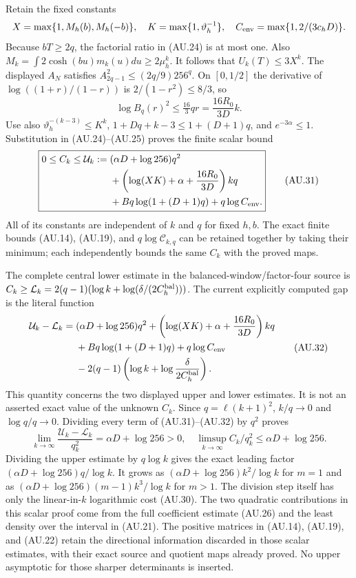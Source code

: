Retain the fixed constants
\[
 X=\max\{1,M_h(b),M_h(-b)\},\quad
 K=\max\{1,\vartheta_h^{-1}\},\quad
 C_{\rm env}=\max\{1,2/(3c_hD)\}.
\]
Because $bT\ge2q$, the factorial ratio in (AU.24) is at most one.
Also $M_k=\int2\cosh(bu)m_k(u)du\ge2\mu_h^k$.
It follows that $U_k(T)\le3X^k$.
The displayed $A_N$ satisfies
$A_{2q-1}^2\le(2q/9)256^q$.
On $[0,1/2]$ the derivative of $\log((1+r)/(1-r))$ is
$2/(1-r^2)\le8/3$, so
\[
 \log B_q(r)^2\le\tfrac{16}{3}qr
                         =\frac{16R_0}{3D}k.             \tag{AU.30}
\]
Use also $\vartheta_h^{-(k-3)}\le K^k$,
$1+Dq+k-3\le1+(D+1)q$, and $e^{-3\alpha}\le1$.
Substitution in (AU.24)--(AU.25) proves the finite scalar bound
\[
 \boxed{\begin{aligned}
 0\le C_k\le\mathcal U_k:={}&(\alpha D+\log256)q^2\\
 &+\left(\log(XK)+\alpha+\frac{16R_0}{3D}\right)kq\\
 &+Bq\log(1+(D+1)q)+q\log C_{\rm env}.
 \end{aligned}}                                             \tag{AU.31}
\]
All of its constants are independent of $k$ and $q$ for fixed $h,b$.
The exact finite bounds (AU.14), (AU.19), and $q\log\mathcal C_{k,q}$
can be retained together by taking their minimum; each independently
bounds the same $C_k$ with the proved maps.

The complete central lower estimate in the balanced-window/factor-four
source is
$C_k\ge\mathcal L_k=2(q-1)(\log k+\log(\delta/(2C_h^{\rm bal})))$.
The current explicitly computed gap is the literal function
\[
 \begin{split}
 \mathcal U_k-\mathcal L_k
  ={}&(\alpha D+\log256)q^2
   +\left(\log(XK)+\alpha+\frac{16R_0}{3D}\right)kq
   \\
   &+Bq\log(1+(D+1)q)+q\log C_{\rm env}\\
   &-2(q-1)\left(\log k+\log\frac{\delta}{2C_h^{\rm bal}}\right).
 \end{split}
 \tag{AU.32}
\]
This quantity concerns the two displayed upper and lower estimates.
It is not an asserted exact value of the unknown $C_k$.
Since $q=\ell(k+1)^2$, $k/q\to0$ and $\log q/q\to0$.
Dividing every term of (AU.31)--(AU.32) by $q^2$ proves
\[
 \lim_{k\to\infty}\frac{\mathcal U_k-\mathcal L_k}{q_k^2}
       =\alpha D+\log256>0,
 \quad
 \limsup_{k\to\infty}C_k/q_k^2\le\alpha D+\log256.
 \tag{AU.33}
\]
Dividing the upper estimate by $q\log k$ gives the exact leading
factor $(\alpha D+\log256)q/\log k$. It grows as
$(\alpha D+\log256)k^2/\log k$ for $m=1$ and as
$(\alpha D+\log256)(m-1)k^3/\log k$ for $m>1$.
The division step itself has only the linear-in-$k$ logarithmic cost
(AU.30). The two quadratic contributions in this scalar proof come
from the full coefficient estimate (AU.26) and the least density over
the interval in (AU.21). The positive matrices in (AU.14), (AU.19),
and (AU.22) retain the directional information discarded in those
scalar estimates, with their exact source and quotient maps already
proved. No upper asymptotic for those sharper determinants is inserted.

